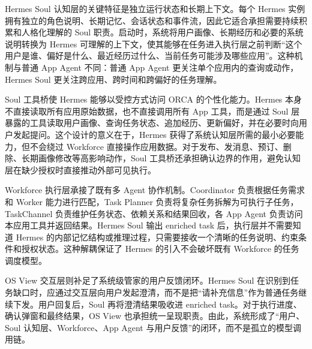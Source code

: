 Hermes Soul 认知层的关键特征是独立运行状态和长期上下文。每个 Hermes 实例拥有独立的角色说明、长期记忆、会话状态和事件流，因此它适合承担需要持续积累和人格化理解的 Soul 职责。启动时，系统将用户画像、长期经历和必要的系统说明转换为 Hermes 可理解的上下文，使其能够在任务进入执行层之前判断“这个用户是谁、偏好是什么、最近经历过什么、当前任务可能涉及哪些应用”。这种机制与普通 App Agent 不同：普通 App Agent 更关注单个应用内的查询或动作，Hermes Soul 更关注跨应用、跨时间和跨偏好的任务理解。

Soul 工具桥使 Hermes 能够以受控方式访问 ORCA 的个性化能力。Hermes 本身不直接读取所有应用原始数据，也不直接调用所有 App 工具，而是通过 Soul 层暴露的工具读取用户画像、查询任务状态、追加经历、更新偏好，并在必要时向用户发起提问。这个设计的意义在于，Hermes 获得了系统认知层所需的最小必要能力，但不会绕过 Workforce 直接操作应用数据。对于发布、发消息、预订、删除、长期画像修改等高影响动作，Soul 工具桥还承担确认边界的作用，避免认知层在缺少授权时直接推动外部可见执行。

Workforce 执行层承接了既有多 Agent 协作机制。Coordinator 负责根据任务需求和 Worker 能力进行匹配，Task Planner 负责将复杂任务拆解为可执行子任务，TaskChannel 负责维护任务状态、依赖关系和结果回收，各 App Agent 负责访问本应用工具并返回结果。Hermes Soul 输出 enriched task 后，执行层并不需要知道 Hermes 的内部记忆结构或推理过程，只需要接收一个清晰的任务说明、约束条件和授权状态。这种解耦保证了 Hermes 的引入不会破坏既有 Workforce 的任务调度模型。

OS View 交互层则补足了系统级管家的用户反馈闭环。Hermes Soul 在识别到任务缺口时，应通过交互层向用户发起澄清，而不是把“请补充信息”作为普通任务继续下发。用户回复后，Soul 再将澄清结果吸收进 enriched task。对于执行进度、确认弹窗和最终结果，OS View 也承担统一呈现职责。由此，系统形成了“用户、Soul 认知层、Workforce、App Agent 与用户反馈”的闭环，而不是孤立的模型调用链。

